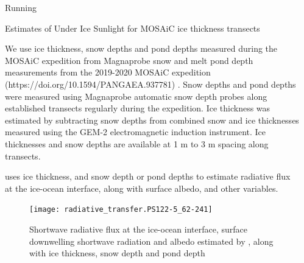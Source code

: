 \documentclass[final]{beamer}
\newlength{\sepwidth}
\newlength{\colwidth}
\newcommand{\separatorcolumn}{\begin{column}{\sepwidth}\end{column}}
\begin{document}
\begin{frame}[t,fragile]
\begin{columns}[t]
\begin{column}{\colwidth}
\begin{exampleblock}{Running }
    
  \end{exampleblock}

  \begin{block}{Estimates of Under Ice Sunlight for MOSAiC ice thickness transects}

    We use ice thickness, snow depths and pond depths measured during
    the MOSAiC expedition from Magnaprobe snow and melt pond depth
    measurements from the 2019-2020 MOSAiC expedition
    (https://doi.org/10.1594/PANGAEA.937781) \cite{itkin_sea_2023}.
    Snow depths and pond depths were measured using Magnaprobe
    automatic snow depth probes along established transects regularly
    during the expedition.  Ice thickness was estimated by subtracting
    snow depths from combined snow and ice thicknesses measured using
    the GEM-2 electromagnetic induction instrument.  Ice thicknesses
    and snow depths are available at 1 m to 3 m spacing along
    transects.

     uses ice thickness, and snow depth or pond depths
    to estimate radiative flux at the ice-ocean interface, along with
    surface albedo, and other variables.

    \begin{figure}[h]
      \texttt{[image: radiative\_transfer.PS122-5\_62-241]}
      \caption{Shortwave radiative flux at the ice-ocean interface, surface downwelling shortwave radiation and albedo estimated by , along with ice thickness, snow depth and pond depth}
    \end{figure}
      

  \end{block}

  
\end{column}
\separatorcolumn



\end{columns}
\end{frame}
\end{document}

